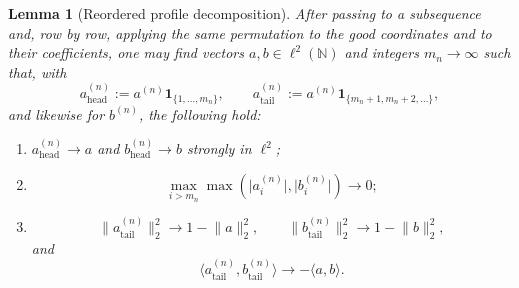 \documentclass[11pt]{amsart}
\numberwithin{equation}{section}
\newtheorem{lemma}[theorem]{Lemma}
\theoremstyle{definition}
\theoremstyle{remark}
\newcommand{\N}{\mathbb N}
\newcommand{\abs}[1]{\lvert #1 \rvert}
\newcommand{\norm}[1]{\lVert #1 \rVert}
\newcommand{\ip}[2]{\langle #1,#2\rangle}
\begin{document}
\begin{lemma}[Reordered profile decomposition]\label{lem:profile}
After passing to a subsequence and, row by row, applying the same permutation
to the good coordinates and to their coefficients, one may find vectors
$a,b\in\ell^2(\N)$ and integers $m_n\to\infty$ such that, with
\[
a_{\mathrm{head}}^{(n)}:=a^{(n)}\mathbf 1_{\{1,\dots,m_n\}},
\qquad
a_{\mathrm{tail}}^{(n)}:=a^{(n)}\mathbf 1_{\{m_n+1,m_n+2,\dots\}},
\]
and likewise for $b^{(n)}$, the following hold:
\begin{enumerate}[label=\rm(\arabic*)]
\item $a_{\mathrm{head}}^{(n)}\to a$ and $b_{\mathrm{head}}^{(n)}\to b$
strongly in $\ell^2$;
\item
\[
\max_{i>m_n}\max(\abs{a_i^{(n)}},\abs{b_i^{(n)}})\to0;
\]
\item
\[
\norm{a_{\mathrm{tail}}^{(n)}}_2^2\to1-\norm{a}_2^2,
\qquad
\norm{b_{\mathrm{tail}}^{(n)}}_2^2\to1-\norm{b}_2^2,
\]
and
\[
\ip{a_{\mathrm{tail}}^{(n)}}{b_{\mathrm{tail}}^{(n)}}
\to -\ip{a}{b}.
\]
\end{enumerate}
\end{lemma}
\end{document}
